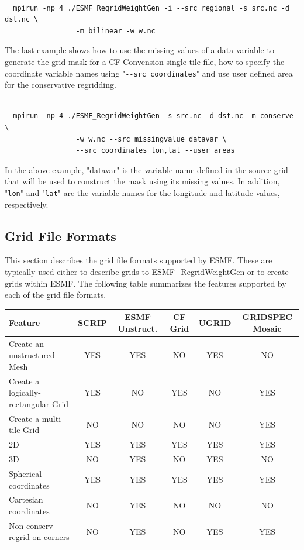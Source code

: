 \begin{verbatim}

  mpirun -np 4 ./ESMF_RegridWeightGen -i --src_regional -s src.nc -d dst.nc \
                 -m bilinear -w w.nc

\end{verbatim}

The last example shows how to use the missing values of a data variable to generate the
grid mask for a CF Convension single-tile file, how to specify the coordinate variable names
using "{\tt \verb+--+src\_coordinates}"
 and use user defined area for the conservative regridding.

\begin{verbatim}

  mpirun -np 4 ./ESMF_RegridWeightGen -s src.nc -d dst.nc -m conserve \
                 -w w.nc --src_missingvalue datavar \
                 --src_coordinates lon,lat --user_areas

\end{verbatim}

In the above example, "datavar" is the variable name defined in the source grid that will
 be used to construct the mask using its missing values.  In addition, "{\tt lon}" and "{\tt lat}" are the
variable names for the longitude and latitude values, respectively.


\subsection{Grid File Formats}

  This section describes the grid file formats supported by ESMF. These are typically used either to describe grids to ESMF\_RegridWeightGen or to create grids within ESMF. The following table summarizes the 
features supported by each of the grid file formats.

\begin{center}
\begin{tabular}{|l|c|c|c|c|c|}
\hline
Feature & SCRIP  & ESMF Unstruct. & CF Grid & UGRID & GRIDSPEC Mosaic\\
\hline
Create an unstructured Mesh            & YES & YES & NO  & YES & NO\\
Create a logically-rectangular Grid   & YES & NO  & YES & NO & YES\\
Create a multi-tile Grid      & NO  & NO  & NO  & NO & YES \\
2D                       & YES & YES & YES & YES & YES\\
3D                      & NO  & YES & NO  & YES & NO\\
Spherical coordinates         & YES & YES & YES & YES & YES\\
Cartesian coordinates         & NO  & YES & NO  & NO & NO\\
Non-conserv regrid on corners & NO  & YES & NO  & YES &YES\\
\hline
\end{tabular}
\label{fig:gridfileformatfeatures}
\end{center}


